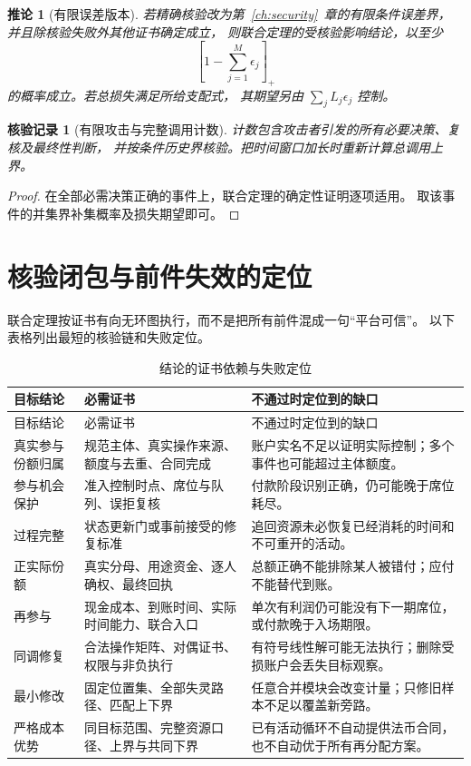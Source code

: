 \documentclass[12pt,a4paper,openany]{report}
\newtheorem{corollary}{推论}[chapter]
\newtheorem{Certificate}{核验记录}[chapter]
\begin{document}
\begin{CJK*}{UTF8}{gkai}
\begin{corollary}[有限误差版本]
若精确核验改为第~\ref{ch:security}~章的有限条件误差界，
并且除核验失败外其他证书确定成立，
则联合定理的受核验影响结论，以至少
\[
\left[1-\sum_{j=1}^{M}\epsilon_j\right]_+
\]
的概率成立。若总损失满足所给支配式，
其期望另由 \(\sum_jL_j\epsilon_j\) 控制。
\end{corollary}
\begin{Certificate}[有限攻击与完整调用计数]
计数包含攻击者引发的所有必要决策、复核及最终性判断，
并按条件历史界核验。把时间窗口加长时重新计算总调用上界。
\end{Certificate}
\begin{proof}
在全部必需决策正确的事件上，联合定理的确定性证明逐项适用。
取该事件的并集界补集概率及损失期望即可。
\end{proof}

\section{核验闭包与前件失效的定位}
联合定理按证书有向无环图执行，而不是把所有前件混成一句“平台可信”。
以下表格列出最短的核验链和失败定位。

\begingroup
\small
\renewcommand{\arraystretch}{1.2}
\begin{longtable}{P{2.6cm}P{5.5cm}P{6.6cm}}
\caption{结论的证书依赖与失败定位}
\label{tab:certificate-audit}\\
\toprule
目标结论 & 必需证书 & 不通过时定位到的缺口\\
\midrule
\endfirsthead
\toprule
目标结论 & 必需证书 & 不通过时定位到的缺口\\
\midrule
\endhead
\bottomrule
\endfoot
真实参与份额归属 & 规范主体、真实操作来源、额度与去重、合同完成 & 账户实名不足以证明实际控制；多个事件也可能超过主体额度。\\
参与机会保护 & 准入控制时点、席位与队列、误拒复核 & 付款阶段识别正确，仍可能晚于席位耗尽。\\
过程完整 & 状态更新门或事前接受的修复标准 & 追回资源未必恢复已经消耗的时间和不可重开的活动。\\
正实际份额 & 真实分母、用途资金、逐人确权、最终回执 & 总额正确不能排除某人被错付；应付不能替代到账。\\
再参与 & 现金成本、到账时间、实际时间能力、联合入口 & 单次有利润仍可能没有下一期席位，或付款晚于入场期限。\\
同调修复 & 合法操作矩阵、对偶证书、权限与非负执行 & 有符号线性解可能无法执行；删除受损账户会丢失目标观察。\\
最小修改 & 固定位置集、全部失灵路径、匹配上下界 & 任意合并模块会改变计量；只修旧样本不足以覆盖新旁路。\\
严格成本优势 & 同目标范围、完整资源口径、上界与共同下界 & 已有活动循环不自动提供法币合同，也不自动优于所有再分配方案。\\
\end{longtable}
\endgroup


\end{CJK*}
\end{document}
